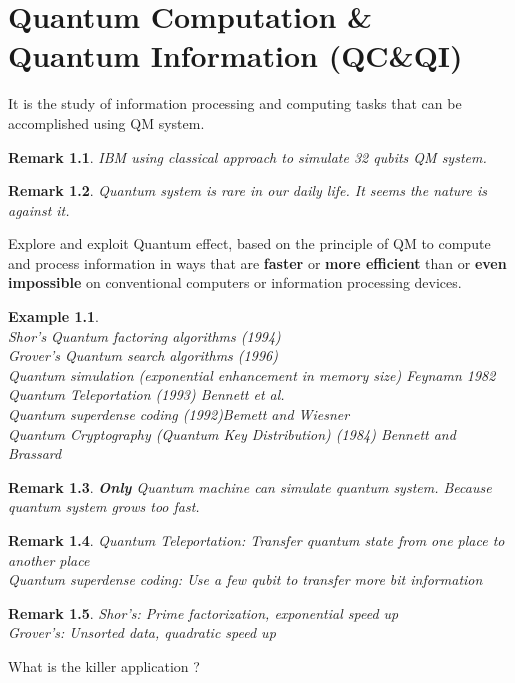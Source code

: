 \documentclass[]{book}
\newtheorem*{remark}{Remark}
\newtheorem*{example}{Example}
\theoremstyle{nonumberplain}
\begin{document}
\chapter{Quantum Computation \& Quantum Information (QC\&QI)}%
\label{sec:quantum_computation_quantum_information}
It is the study of information processing and computing tasks that can be accomplished using QM system.
\begin{remark}
IBM using classical approach to simulate 32 qubits QM system. 
\end{remark}
\begin{remark}
Quantum system is rare in our daily life. It seems the nature is against it.
\end{remark}
\begin{flushleft}
Explore and exploit Quantum effect, based on the principle of QM to compute and process information in ways that are \textbf{faster} or \textbf{more efficient} than or \textbf{even impossible} on conventional computers or information processing devices.
\end{flushleft}
\begin{example}
\ \\
Shor's Quantum factoring algorithms (1994)\\
Grover's Quantum search algorithms (1996)\\
Quantum simulation (exponential enhancement in memory size) Feynamn 1982\\
Quantum Teleportation (1993) Bennett et al.\\
Quantum superdense coding (1992)Bemett and Wiesner \\
Quantum Cryptography (Quantum Key Distribution) (1984) Bennett and Brassard
\end{example}
\begin{remark}
\textbf{Only} Quantum machine can simulate quantum system. Because quantum system grows too fast.
\end{remark}
\begin{remark}
Quantum Teleportation: Transfer quantum state from one place to another place \\
Quantum superdense coding: Use a few qubit to transfer more bit information
\end{remark}
\begin{remark}
Shor's: Prime factorization, exponential speed up\\
Grover's: Unsorted data, quadratic speed up\\ 
\end{remark}
\begin{center}
What is the killer application ?
\end{center}
\end{document}
